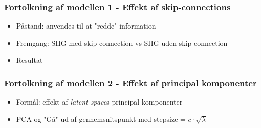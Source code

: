 \documentclass{beamer}
\begin{document}
\begin{frame}
    \frametitle{Fortolkning af modellen 1 - Effekt af skip-connections}
    \begin{itemize}
        \item<1-> Påstand: anvendes til at "redde" information
        \item<2-> Fremgang: SHG med skip-connection vs SHG uden skip-connection
        \item<3-> Resultat
    \end{itemize}
    \begin{minipage}{\textwidth}
    \end{minipage}
\end{frame}

\begin{frame}
    \frametitle{Fortolkning af modellen 2 - Effekt af principal komponenter}
    \begin{itemize}
        \item<1-> Formål: effekt af \textit{latent space}s principal komponenter
        \item<2-> PCA og "Gå" ud af gennemsnitspunkt med stepsize = $c \cdot \sqrt{\lambda}$
    \end{itemize}
    \begin{minipage}{\textwidth}
    \end{minipage}
\end{frame}
\end{document}
